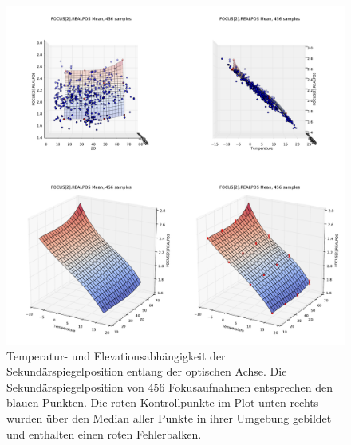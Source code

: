\begin{figure}[h]
	\centering
	\includegraphics[scale=.45]{tsi_surf/POSITION_INSTRUMENTAL_FOCUS_2__REALPOS_mean.pdf}
	\caption[Temperatur- und Elevationsabhängigkeit der Sekundärspiegelposition]{Temperatur- und Elevationsabhängigkeit der Sekundärspiegelposition entlang der optischen Achse. Die Sekundärspiegelposition von 456 Fokusaufnahmen entsprechen den blauen Punkten. Die roten Kontrollpunkte im Plot unten rechts wurden über den Median aller Punkte in ihrer Umgebung gebildet und enthalten einen roten Fehlerbalken.}

    \label{focus_surf}
\end{figure}
